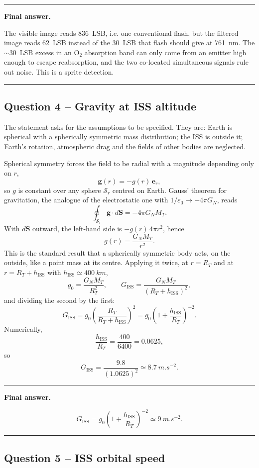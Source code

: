 \documentclass[11pt,a4paper]{article}
\newenvironment{finalanswer}{%
  \begin{center}\begin{minipage}{0.94\linewidth}\hrule\vspace{0.45em}\textbf{Final answer. }%
}{%
  \vspace{0.45em}\hrule\end{minipage}\end{center}%
}
\newcommand{\RT}{R_T}
\newcommand{\ISS}{\mathrm{ISS}}
\newcommand{\Otwo}{\ensuremath{\mathrm{O}_2}}
\begin{document}
\begin{finalanswer}
The visible image reads 836~LSB, i.e. one conventional flash, but the filtered image reads 62~LSB instead of the 30~LSB that flash should give at \SI{761}{nm}. The $\sim$30~LSB excess in an \Otwo{} absorption band can only come from an emitter high enough to escape reabsorption, and the two co-located simultaneous signals rule out noise. This is a sprite detection.
\end{finalanswer}

\subsection*{Question 4 -- Gravity at ISS altitude}

The statement asks for the assumptions to be specified. They are: Earth is
spherical with a spherically symmetric mass distribution; the ISS is outside it;
Earth's rotation, atmospheric drag and the fields of other bodies are neglected.

Spherical symmetry forces the field to be radial with a magnitude depending only
on $r$,
\[
 \mathbf g(r)=-g(r)\,\mathbf e_r,
\]
so $g$ is constant over any sphere $\mathcal S_r$ centred on Earth. Gauss'
theorem for gravitation, the analogue of the electrostatic one with
$1/\varepsilon_0\to-4\pi G_N$, reads
\[
 \oint_{\mathcal S_r}\mathbf g\cdot d\mathbf S=-4\pi G_N M_T .
\]
With $d\mathbf S$ outward, the left-hand side is $-g(r)\,4\pi r^2$, hence
\[
 g(r)=\frac{G_N M_T}{r^2}.
\]
This is the standard result that a spherically symmetric body acts, on the
outside, like a point mass at its centre. Applying it twice, at $r=\RT$ and at
$r=\RT+h_{\ISS}$ with $h_{\ISS}\simeq\SI{400}{km}$,
\[
 g_0=\frac{G_N M_T}{\RT^2},
 \qquad
 G_{\ISS}=\frac{G_N M_T}{(\RT+h_{\ISS})^2},
\]
and dividing the second by the first:
\[
 G_{\ISS}=g_0\left(\frac{\RT}{\RT+h_{\ISS}}\right)^2
          =g_0\left(1+\frac{h_{\ISS}}{\RT}\right)^{-2}.
\]
Numerically,
\[
 \frac{h_{\ISS}}{\RT}=\frac{400}{6400}=0.0625,
\]
so
\[
 G_{\ISS}=\frac{9.8}{(1.0625)^2}\simeq\SI{8.7}{m.s^{-2}}.
\]

\begin{finalanswer}
\[
G_{\ISS}=g_0\left(1+\frac{h_{\ISS}}{\RT}\right)^{-2}\simeq\SI{9}{m.s^{-2}}.
\]
\end{finalanswer}

\subsection*{Question 5 -- ISS orbital speed}
\end{document}

